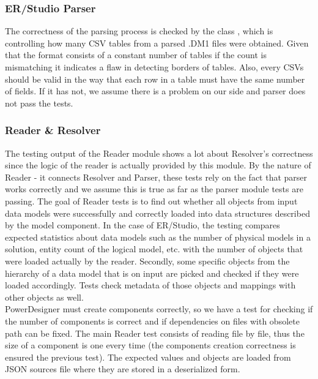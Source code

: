 \subsubsection{ER/Studio Parser}

The correctness of the parsing process is checked by the class , which is controlling how many CSV tables from a parsed .DM1 files were obtained. Given that the format consists of a constant number of tables if the count is mismatching it indicates a flaw in detecting borders of tables.
Also, every CSVs should be valid in the way that each row in a table must have the same number of fields. If it has not, we assume there is a problem on our side and parser does not pass the tests.

\subsubsection{Reader \& Resolver}

The testing output of the Reader module shows a lot about Resolver's correctness since the logic of the reader is actually provided by this module. 
By the nature of Reader - it connects Resolver and Parser, these tests rely on the fact that parser works correctly and we assume this is true as far as the parser module tests are passing.
The goal of Reader tests is to find out whether all objects from input data models were successfully and correctly loaded into data structures described by the model component.
In the case of ER/Studio, the testing compares expected statistics about data models such as the number of physical models in a solution, entity count of the logical model, etc. with the number of objects that were loaded actually by the reader.
Secondly, some specific objects from the hierarchy of a data model that is on input are picked and checked if they were loaded accordingly. Tests check metadata of those objects and mappings with other objects as well. \\ 

PowerDesigner must create components correctly, so we have a test for checking if the number of components is correct and if dependencies on files with obsolete path can be fixed.
The main Reader test consists of reading file by file, thus the size of a component is one every time (the components creation correctness is ensured the previous test).
The expected values and objects are loaded from JSON sources file where they are stored in a deserialized form.


